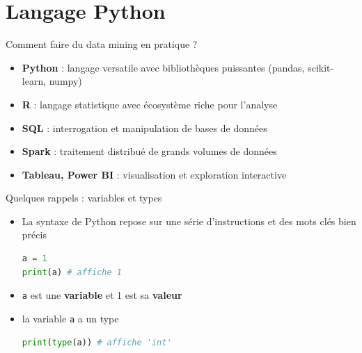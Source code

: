 

\section{Langage Python}

\begin{frame}{Comment faire du data mining en pratique ?}

    \begin{itemize}
        \item<+-> \textbf{Python} : langage versatile avec bibliothèques puissantes (pandas, scikit-learn, numpy)
        \item<+-> \textbf{R} : langage statistique avec écosystème riche pour l'analyse
        \item<+-> \textbf{SQL} : interrogation et manipulation de bases de données
        \item<+-> \textbf{Spark} : traitement distribué de grands volumes de données
        \item<+-> \textbf{Tableau, Power BI} : visualisation et exploration interactive
    \end{itemize}
\end{frame}





    \begin{frame}[fragile]{Quelques rappels : variables et types}
        \begin{itemize}
        \item<+->[\textcolor{white}{a}] La syntaxe de Python repose sur une série d'instructions et des mots clés bien précis
\begin{lstlisting}[language=Python, morekeywords={as, TypeError}, numbers=none]
a = 1
print(a) # affiche 1
\end{lstlisting}
        \item<+-> \texttt{a} est une \textbf{variable} et 1 est sa \textbf{valeur}
        \item<+-> la variable \texttt{a} a un type
\begin{lstlisting}[language=Python, morekeywords={as, TypeError}, numbers=none]
print(type(a)) # affiche 'int'
\end{lstlisting}
        \end{itemize}
  \end{frame}
  


